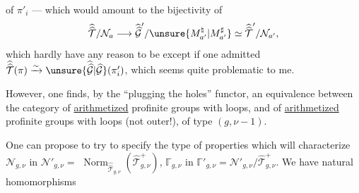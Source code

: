 
 of $\pi'_i$ --- which
would amount to the bijectivity of
\[
\widehat{\widehat{\mathcal T}}/\mathcal N_a
\longrightarrow
\widehat{\widehat{\mathcal G}}'/\unsure{M_{a'}^{\natural}|M_{a'}^{\sharp}}
\simeq \widehat{\widehat{\mathcal T}}'/\mathcal N_{a'},
\]
which  hardly have any reason to be except if
one admitted
$\widehat{\widehat{\mathcal T}}(\pi)\xrightarrow{\sim}\unsure{\widehat{\widehat{\mathcal G}}|\widehat{\mathcal G}}(\pi'_i)$,
which seems quite problematic to me.

However, one finds, by the
``plugging the holes'' functor, an equivalence
between the category of 
 \uline{arithmetized} profinite groups with loops,
and of \uline{arithmetized} profinite groups with loops
(not outer!), of type
$(g,\nu-1)$.

One can propose to try to
specify  the type of properties
which will characterize $\mathcal N_{g,\nu}$ in $\mathcal N'_{g,\nu}=$
$\operatorname{Norm}_{\widehat{\widehat{\mathcal T}}_{g,\nu}}
(\widehat{\mathcal T}_{g,\nu}^{+})$,
$\mathbb{\Gamma}_{g,\nu}$
in $\mathbb{\Gamma}'_{g,\nu}=\mathcal N'_{g,\nu}/\widehat{\mathcal T}_{g,\nu}^{+}$.
We have natural homomorphisms



